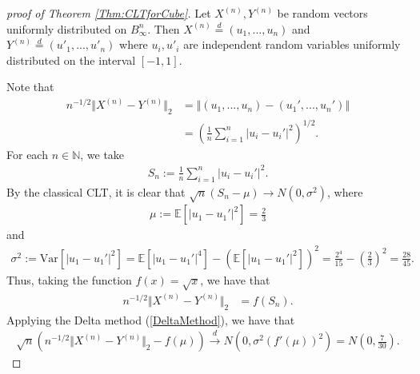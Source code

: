 \documentclass[10pt]{amsart}
\def\N{\mathbb{N}}
\def\E{\mathbb{E}}
\def\var{\text{Var}}
\numberwithin{equation}{section}
\begin{document}
\begin{proof}[proof of Theorem \ref{Thm:CLTforCube}]
Let $X^{(n)},Y^{(n)}$ be random vectors uniformly distributed on $B_\infty ^n$. Then $X^{(n)} \overset{d}{=} (u_1,...,u_n)$ and $Y^{(n)} \overset{d}{=} (u'_1,...,u'_n)$ where $u_i, u'_i$ are independent random variables uniformly distributed on the interval $[-1,1]$.

Note that
\begin{align*}
n^{-1/2}\Vert X^{(n)} - Y^{(n)} \Vert _2 & = \left\Vert  (u_1,...,u_n) - (u_1',...,u_n') \right\Vert
 \\
 & = \left( \frac{1}{n} \sum _{i=1}^n \left| u_i - u_i' \right|^2 \right)^{1/2} .
\end{align*}
For each $n\in \N$, we take
\begin{align}
\label{SnCLTCube}
S_n := \frac{1}{n} \sum _{i=1}^n \left| u_i - u_i' \right|^2.
\end{align}
By the classical CLT, it is clear that $\sqrt{n}\left( S_n - \mu \right) \to N (0 , \sigma ^2)$, where 
\begin{align*}
\mu := \E[ |u_1 - u_1' |^2 ] = \frac{2}{3}
\end{align*}
and
\begin{align*}
\sigma^2 := \var \left[ |u_1-u_1'|^2 \right] = \E\left[ |u_1-u_1'|^4 \right] - \left( \E\left[ |u_1-u_1'|^2 \right]\right)^2 = 
\frac{2^4}{15} - \left(\frac{2}{3}\right)^2 = \frac{28}{45}.
\end{align*}
Thus, taking the function $f(x) = \sqrt{x}$, we have that
\begin{align*}
n^{-1/2}\Vert X^{(n)} - Y^{(n)} \Vert _2 & = f\left( S_n  \right).
\end{align*}
Applying the Delta method (\ref{DeltaMethod}), we have that
\begin{align*}
\sqrt{n} \left( n^{-1/2}\Vert X^{(n)} - Y^{(n)} \Vert _2 - f (\mu ) \right)  \overset{d}{\to} N \left( 0 , \sigma ^2 (f'(\mu))^2  \right) = N\left( 0 , \frac{7}{30} \right).
\end{align*}



\end{proof}
\end{document}
